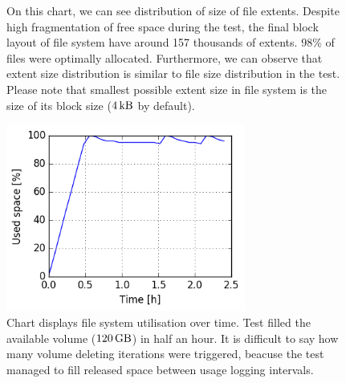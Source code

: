 \documentclass[
  color, %
  table, %
  lof,   %
  lot,   %
]{fithesis3}
\begin{document}
\begin{figure}[h]
    \centering
    \caption[Size distribution of file extents of XFS during testing on SSD with regular trimming]{On this chart, we can see distribution of size of file extents. Despite high fragmentation of free space during the test, the final block layout of file system have around 157 thousands of extents. 98\% of files were optimally allocated. Furthermore, we can observe that extent size distribution is similar to file size distribution in the test. Please note that smallest possible extent size in file system is the size of its block size ($\SI{4}{\kilo\byte}$ by default).}
    \label{fig:used_xfs_ssd_trim}
\end{figure}

\begin{figure}[!h]
    \begin{minipage}{\textwidth}
        \centering
        \includegraphics[width=0.7\textwidth]{../charts/SSD_xfs_trim/usage.png}
        \caption[Usage of available space of XFS during testing on SSD with regular trimming]{Chart displays file system utilisation over time. Test filled the available volume ($\SI{120}{\giga\byte}$) in half an hour. It is difficult to say how many volume deleting iterations were triggered, beacuse the test managed to fill released space between usage logging intervals.}
\label{fig:usage_xfs_ssd_trim}
    \end{minipage}
\end{figure}
\end{document}
